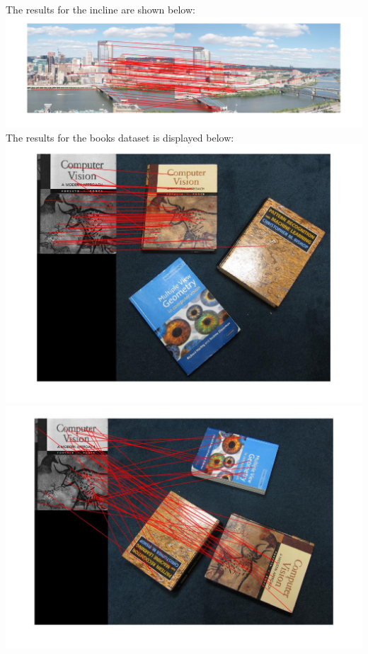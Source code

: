 \documentclass[12pt]{article}
\newenvironment{problem}[2][Problem]{\begin{trivlist}
\item[\hskip \labelsep {\bfseries #1}\hskip \labelsep {\bfseries #2.}]}{\end{trivlist}}
\begin{document}
\begin{problem}{2.4}
The results for the incline are shown below:\\
\includegraphics[scale=0.3]{results/incline_match}\\
\newpage
The results for the books dataset is displayed below:\\
\includegraphics[scale=0.3]{results/books_1}\\
\includegraphics[scale=0.29]{results/books_floor_rot}\\

\end{problem}
\end{document}
